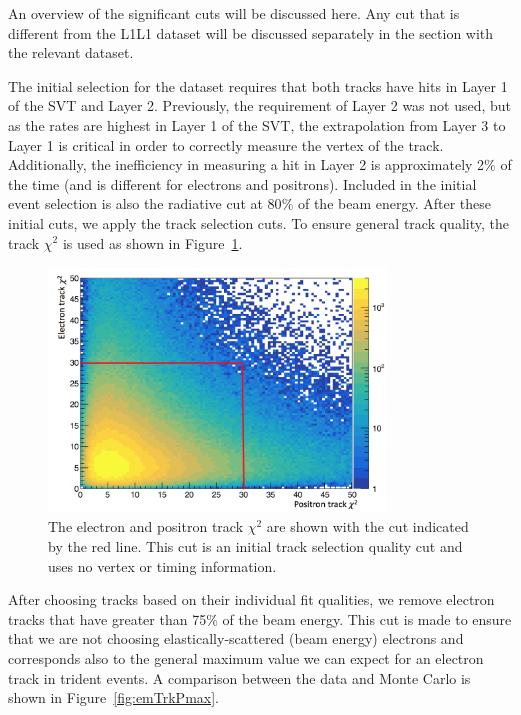 An overview of the significant cuts will be discussed here. Any cut that is different from the L1L1 dataset will be discussed separately in the section with the relevant dataset. 

\indent The initial selection for the dataset requires that both tracks have hits in Layer 1 of the SVT and Layer 2. Previously, the requirement of Layer 2 was not used, but as the rates are highest in Layer 1 of the SVT, the extrapolation from Layer 3 to Layer 1 is critical in order to correctly measure the vertex of the track. Additionally, the inefficiency in measuring a hit in Layer 2 is approximately 2$\%$ of the time (and is different for electrons and positrons). Included in the initial event selection is also the radiative cut at 80$\%$ of the beam energy. After these initial cuts, we apply the track selection cuts. To ensure general track quality, the track $\chi^2$ is used as shown in Figure~\ref{fig:trkChi2}.

\begin{figure}[H]
  \centering
      \includegraphics[width=0.8\textwidth]{plots/trkChi2.png}
  \caption{The electron and positron track $\chi^2$ are shown with the cut indicated by the red line. This cut is an initial track selection quality cut and uses no vertex or timing information.}
  \label{fig:trkChi2}
\end{figure} 

After choosing tracks based on their individual fit qualities, we remove electron tracks that have greater than 75$\%$ of the beam energy. This cut is made to ensure that we are not choosing elastically-scattered (beam energy) electrons and corresponds also to the general maximum value we can expect for an electron track in trident events. A comparison between the data and Monte Carlo is shown in Figure~\ref{fig:emTrkPmax}.

